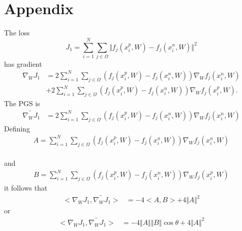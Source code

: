 \documentclass[runningheads]{llncs}
\begin{document}
  \section*{Appendix}  %
  The loss 
  \begin{equation}
    J_1 = \sum_{i=1}^N \sum_{j \in \Omega}\Vert f_j(x^p_{i},W) - f_j(x^n_{i},W) \Vert^2 
 \end{equation}
 has gradient 
 \begin{equation}
 \begin{split}
   \nabla_W J_{1}& = 2\sum_{i=1}^N \sum_{j \in \Omega}(f_j(x^p_{i},W) - f_j(x^n_{i},W))\nabla_W f_j(x^n_i,W) \\
   &+ 2\sum_{i=1}^N \sum_{j \in \Omega}(f_j(x^p_{i},W) - f_j(x^n_{i},W))\nabla_W f_j(x^p_i,W).
 \end{split}
\end{equation}
 The PGS is 
 \begin{equation}
 \begin{split}
\widetilde{\nabla_W J_{1}}& = 2\sum_{i=1}^N \sum_{j \in \Omega}(f_j(x^p_{i},W) - f_j(x^n_{i},W))\nabla_W f_j(x^n_i,W)
\end{split}
  \end{equation}
  Defining
  \begin{equation}
    \begin{split}
      A = \sum_{i=1}^N \sum_{j \in \Omega}(f_j(x^p_{i},W) - f_j(x^n_{i},W))\nabla_W f_j(x^n_i,W)
    \end{split}
  \end{equation}\\
  and
  \begin{equation}
    \begin{split}
      B = \sum_{i=1}^N \sum_{j \in \Omega}(f_j(x^p_{i},W) - f_j(x^n_{i},W))\nabla_W f_j(x^p_i,W)
    \end{split}
  \end{equation}
  it follows that
  \begin{equation}
 \begin{split}
   <\nabla_W J_{1},\widetilde{\nabla_W J_{1}}>& = -4 <A,B> + 4\Vert A \Vert^2 
 \end{split}
  \end{equation}
 or \begin{equation}
 \begin{split}
<\nabla_W J_{1},\widetilde{\nabla_W J_{1}}>& = -4 \Vert A\Vert \Vert B\Vert \cos{\theta} + 4\Vert A \Vert^2 
\end{split}
  \end{equation}
\end{document}
